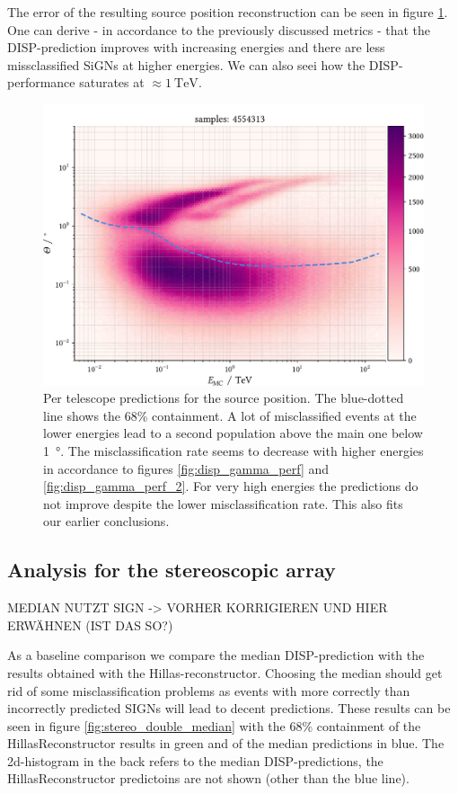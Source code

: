 The error of the resulting source position reconstruction 
can be seen in figure \ref{fig:sens_telescope}.
One can derive - in accordance to the previously discussed metrics - 
that the DISP-prediction improves with increasing energies and there are less
missclassified SiGNs at higher energies.
We can also seei how the DISP-performance saturates at $\approx \SI{1}{\tera\electronvolt}$.

\begin{figure}
    \centering
    \includegraphics[width=.8\textwidth]{../analysis/plots/gamma/tel_vs_energy.pdf}
    \caption{Per telescope predictions for the source position. The blue-dotted line 
    shows the 68\% containment. A lot of misclassified events at the lower energies
    lead to a second population above the main one below \SI{1}{\degree}.
    The misclassification rate seems to decrease with higher energies 
    in accordance to figures \ref{fig:disp_gamma_perf} and \ref{fig:disp_gamma_perf_2}.
    For very high energies the predictions do not improve despite the lower 
    misclassification rate. This also fits our earlier conclusions.}
    \label{fig:sens_telescope}
\end{figure}


\subsection{Analysis for the stereoscopic array}
MEDIAN NUTZT SIGN -> VORHER KORRIGIEREN UND HIER ERWÄHNEN (IST DAS SO?)

As a baseline comparison we compare the median DISP-prediction 
with the results obtained with the Hillas-reconstructor.
Choosing the median should get rid of some misclassification 
problems as events with more correctly than incorrectly 
predicted SIGNs will lead to decent predictions.
These results can be seen in figure \ref{fig:stereo_double_median}
with the 68\% containment of the HillasReconstructor results in green 
and of the median predictions in blue.
The 2d-histogram in the back refers to the median DISP-predictions,
the HillasReconstructor predictoins are not shown (other than the blue line).

